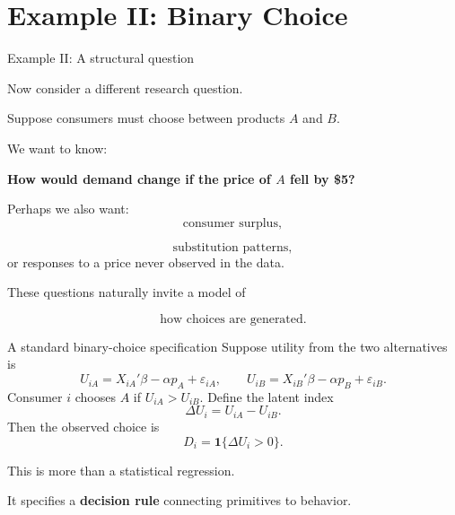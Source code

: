 \documentclass[aspectratio=169,11pt]{beamer}
\newcommand{\ind}{\mathbf{1}}
\begin{document}
\section{Example II: Binary Choice}

\begin{frame}{Example II: A structural question}

Now consider a different research question.

Suppose consumers must choose between products $A$ and $B$.

We want to know:

\begin{center}
\Large
\textbf{How would demand change if the price of $A$ fell by \$5?}
\end{center}

\vspace{0.4em}

Perhaps we also want:
\[
\text{consumer surplus},
\]

\[
\text{substitution patterns},
\]
or responses to a price never observed in the data.

\vspace{0.35em}

These questions naturally invite a model of

\[
\boxed{\text{how choices are generated}.}
\]

\end{frame}

\begin{frame}{A standard binary-choice specification}
Suppose utility from the two alternatives is
\[
U_{iA} = X_{iA}'\beta-\alpha p_A+\varepsilon_{iA},
\qquad
U_{iB} = X_{iB}'\beta-\alpha p_B+\varepsilon_{iB}.
\]
Consumer $i$ chooses $A$ if $U_{iA}>U_{iB}$. Define the latent index
\[
\Delta U_i = U_{iA}-U_{iB}.
\]
Then the observed choice is
\[
D_i = \ind\{\Delta U_i>0\}.
\]

\vspace{0.3em}

This is more than a statistical regression.

It specifies a \textbf{decision rule} connecting primitives to behavior.
\end{frame}
\end{document}
